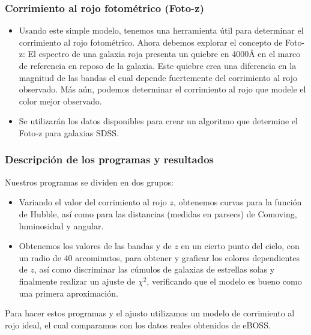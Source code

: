 \documentclass{beamer}
\begin{document}
\begin{frame}
\frametitle{Corrimiento al rojo fotométrico (Foto-z)}

\begin{itemize}
	\item Usando este simple modelo, tenemos una herramienta útil para determinar el corrimiento al rojo fotométrico. Ahora debemos explorar el concepto de Foto-z: El espectro de una galaxia roja presenta un quiebre en 4000Å en el marco de referencia en reposo de la galaxia. Este quiebre crea una diferencia en la magnitud de las bandas el cual depende fuertemente del corrimiento al rojo observado. Más aún, podemos determinar el corrimiento al rojo que modele el color mejor observado.
	\item Se utilizarán los datos disponibles para crear un algoritmo que determine el Foto-z para galaxias SDSS.
\end{itemize}


\end{frame}

\begin{frame}
\frametitle{Descripción de los programas y resultados}
Nuestros programas se dividen en dos grupos:
\begin{itemize}
	\item Variando el valor del corrimiento al rojo $z$, obtenemos curvas para la función de Hubble, así como para las distancias (medidas en parsecs) de Comoving, luminosidad y angular.
	\item Obtenemos los valores de las bandas y de $z$ en un cierto punto del cielo, con un radio de 40 arcominutos, para obtener y graficar los colores dependientes de $z$, así como discriminar las cúmulos de galaxias de estrellas solas y finalmente realizar un ajuste de $\chi^2$, verificando que el modelo es bueno como una primera aproximación.
\end{itemize}

Para hacer estos programas y el ajusto utilizamos un modelo de corrimiento al rojo ideal, el cual comparamos con los datos reales obtenidos de eBOSS.

\end{frame}
\end{document}
